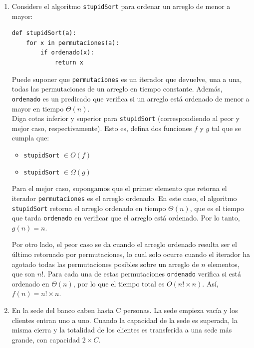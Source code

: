 \documentclass[letterpaper, 12pt]{article}
\begin{document}
\begin{enumerate}


\item Considere el algoritmo \texttt{stupidSort} para ordenar un arreglo de menor a
mayor:
\begin{verbatim}
def stupidSort(a):
    for x in permutaciones(a):
        if ordenado(x):
            return x
\end{verbatim}

Puede suponer que \texttt{permutaciones} es un iterador que devuelve, una a una, todas las permutaciones de un arreglo en tiempo constante. Además, \texttt{ordenado} es un predicado que verifica si un arreglo está ordenado de menor a mayor en tiempo $\Theta(n)$. \\

Diga cotas inferior y superior para \texttt{stupidSort} (correspondiendo al peor y mejor caso, respectivamente). Esto es, defina dos funciones $f$ y $g$ tal que se cumpla que:
\begin{multicols}{2}
    \begin{itemize}
        \item \texttt{stupidSort} $\in O(f)$
        \item \texttt{stupidSort} $\in \Omega(g)$
    \end{itemize}
\end{multicols}

Para el mejor caso, supongamos que el primer elemento que retorna el iterador \texttt{permutaciones} es el arreglo ordenado. En este caso, el algoritmo \texttt{stupidSort} retorna el arreglo ordenado en tiempo $\Theta(n)$, que es el tiempo que tarda \texttt{ordenado} en verificar que el arreglo está ordenado. Por lo tanto, $g(n) = n$.

Por otro lado, el peor caso se da cuando el arreglo ordenado resulta ser el último retornado por {permutaciones}, lo cual solo ocurre cuando el iterador ha agotado todas las permutaciones posibles sobre un arreglo de $n$ elementos, que son $n!$. Para cada una de estas permutaciones \texttt{ordenado} verifica si está ordenado en $\Theta(n)$, por lo que el tiempo total es $O(n! \times n)$. Así, $f(n) = n! \times n$. \\


\item  En la sede del banco caben hasta C personas. La sede empieza vacía y los
clientes entran uno a uno. Cuando la capacidad de la sede es superada, la misma cierra y la totalidad de los clientes es transferida a una sede más grande, con capacidad $2 \times C$.


\end{enumerate}
\end{document}
